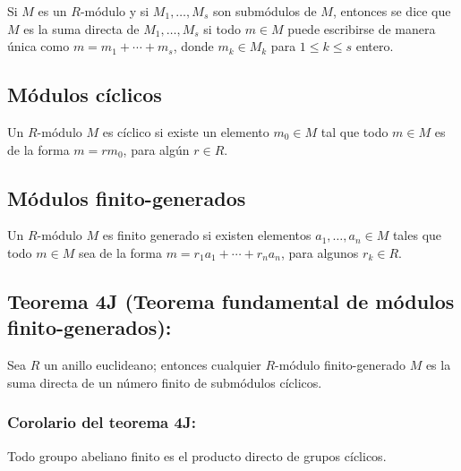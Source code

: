 \documentclass{article}
\begin{document}
Si $M$ es un $R$-módulo y si $M_1,\ldots,M_s$ son submódulos de $M$, entonces se dice que $M$ es la suma directa de $M_1,\ldots,M_s$ si todo $m\in M$ puede escribirse de manera única como $m=m_1+\cdots+m_s$, donde $m_k\in M_k$ para $1\leq k\leq s$ entero.

\subsection*{\color{violet} Módulos cíclicos}

Un $R$-módulo $M$ es cíclico si existe un elemento $m_0\in M$ tal que todo $m\in M$ es de la forma $m=rm_0$, para algún $r\in R$.

\subsection*{\color{violet} Módulos finito-generados}

Un $R$-módulo $M$ es finito generado si existen elementos $a_1,\ldots,a_n\in M$ tales que todo $m\in M$ sea de la forma $m=r_1a_1+\cdots+r_na_n$, para algunos $r_k\in R$.

\subsection*{\color{red} Teorema 4J (Teorema fundamental de módulos finito-generados):}

Sea $R$ un anillo euclideano; entonces cualquier $R$-módulo finito-generado $M$ es la suma directa de un número finito de submódulos cíclicos.

\subsubsection*{\color{red} Corolario del teorema 4J:}

Todo groupo abeliano finito es el producto directo de grupos cíclicos.
\end{document}
